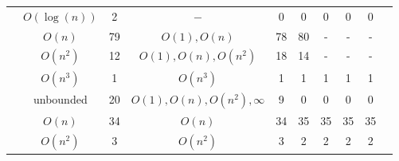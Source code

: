 \begin{table}[ht]
{\begin{tabular}{ >{\scriptsize}c | >{\scriptsize}c | >{\scriptsize}c | >{\scriptsize}c | c | c | c | c | c | c }
            \cline{2-9}
            & $O(\log(n))$ &  2     &   $-$ & 0  & 0 & 0 & 0 & 0 \\
            \cline{2-9}
            & $O(n)$       & 79     &   $ O(1), O(n)$ & 78  & 80 & - & - & - & \\
            \cline{2-9}
            & $O(n^2)$     & 12     &   $O(1), O(n), O(n^2)$ & 18 & 14 & - & - & - \\
            \cline{2-9}
            & $O(n^3)$      &  1    &   $O(n^3)$     & 1  & 1 & 1 & 1 & 1 \\
            \cline{2-9}
            & unbounded    &  20    &   $O(1), O(n), O(n^2), \infty$  & 9  & 0 & 0 & 0 & 0 \\
            \hline \hline
            \multirow{3}{*}{Tianhan} 
            & $O(n)$       & 34     & $O(n) $ & 34 & 35 & 35 & 35 & 35 \\
            \cline{2-9}
            & $O(n^2)$      & 3    &  $O(n^2)$  & 3 & 2 & 2 & 2 & 2 \\
            \hline
            \end{tabular}
        }
        \vspace{-1cm}
    \end{table}
    
    